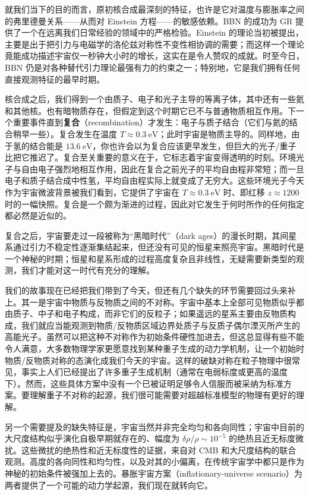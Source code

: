 就我们当下的目的而言，原初核合成最深刻的特征，也许是它对温度与膨胀率之间的弗里德曼关系——从而对 Einstein 方程——的敏感依赖。BBN 的成功为 GR 提供了一个在远离我们日常经验的领域中的严格检验。Einstein 的理论当初被提出，主要是出于把引力与电磁学的洛伦兹对称性不变性相协调的需要；而这样一个理论竟能成功描述宇宙仅一秒钟大小时的增长，这实在是令人赞叹的成就。时至今日，BBN 仍是对各种替代引力理论最强有力的约束之一；特别地，它是我们拥有任何直接观测特征的最早时期。

核合成之后，我们得到一个由质子、电子和光子主导的等离子体，其中还有一些氦和其他核。也有暗物质存在，但假定到这个时期它已不与普通物质相互作用。下一个重要事件直到\textbf{复合}（recombination）才发生：电子与质子结合（它们与氦的结合稍早一些）。复合发生在温度 $T\approx 0.3~\mathrm{eV}$；此时宇宙是物质主导的。同样地，由于氢的结合能是 $13.6~\mathrm{eV}$，你也许会以为复合应该更早发生，但巨大的光子/重子比把它推迟了。复合至关重要的意义在于，它标志着宇宙变得透明的时刻。环境光子与自由电子强烈地相互作用，因此在复合之前光子的平均自由程非常短；而一旦电子和质子结合成中性氢，平均自由程实际上就变成了无穷大。这些环境光子今天作为宇宙微波背景被我们看到，它提供了宇宙在 $T\approx 0.3~\mathrm{eV}$ 时、即红移 $z\approx 1200$ 时的一幅快照。复合是一个颇为渐进的过程，因此对它发生于何时所作的任何指定都必然是近似的。

复合之后，宇宙要走过一段被称为“黑暗时代”（dark ages）的漫长时期，其间星系通过引力不稳定性逐渐集结起来，但还没有可见的恒星来照亮宇宙。黑暗时代是一个神秘的时期；恒星和星系形成的过程高度复杂且非线性，无疑需要新类型的观测，我们才能对这一时代有充分的理解。

我们的故事现在已经把我们带到了今天，但还有几个缺失的环节需要回过头来补上。其一是宇宙中物质与反物质之间的不对称。宇宙中基本上全部可见物质似乎都由质子、中子和电子构成，而非它们的反粒子；如果遥远的星系主要由反物质构成，我们就应当能观测到物质/反物质区域边界处质子与反质子偶尔湮灭所产生的高能光子。虽然可以把这种不对称作为初始条件硬性加进去，但这总显得有些不能令人满意，大多数物理学家更愿意找到某种重子生成的动力学机制，让一个初始时物质/反物质对称的态演化成我们今天的宇宙。这样的破缺对称在粒子物理中很常见，事实上人们已经提出了许多重子生成机制（通常在电弱标度或更高的温度下）。然而，这些具体方案中没有一个已被证明足够令人信服而被采纳为标准方案。要理解重子不对称的起源，我们很可能需要对超越标准模型的物理有更好的理解。

另一个需要提及的缺失特征是，宇宙当然并非完全均匀和各向同性；宇宙中目前的大尺度结构似乎演化自极早期就存在的、幅度为 $\delta\rho/\rho\sim 10^{-5}$ 的绝热且近无标度微扰。这些微扰的绝热性和近无标度性的证据，来自对 CMB 和大尺度结构的联合观测。高度的各向同性和均匀性，以及对其的小偏离，在传统宇宙学中都只是作为神秘的初始条件被强加上去的。暴胀宇宙方案（inflationary-universe scenario）为两者提供了一个可能的动力学起源，我们现在就转向它。

